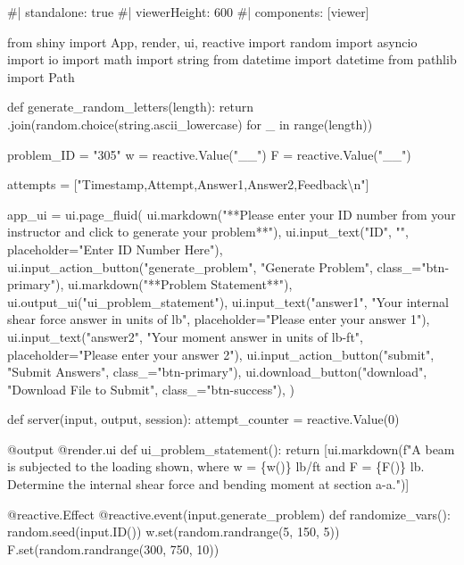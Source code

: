 \documentclass[
  letterpaper,
  DIV=11,
  numbers=noendperiod]{scrreprt}
\newenvironment{Shaded}{\begin{snugshade}}{\end{snugshade}}
\newcommand{\NormalTok}[1]{\textcolor[rgb]{0.00,0.23,0.31}{#1}}
\begin{document}
\begin{Shaded}
\begin{Highlighting}[]
\NormalTok{\#| standalone: true}
\NormalTok{\#| viewerHeight: 600}
\NormalTok{\#| components: [viewer]}

\NormalTok{from shiny import App, render, ui, reactive}
\NormalTok{import random}
\NormalTok{import asyncio}
\NormalTok{import io}
\NormalTok{import math}
\NormalTok{import string}
\NormalTok{from datetime import datetime}
\NormalTok{from pathlib import Path}

\NormalTok{def generate\_random\_letters(length):}
\NormalTok{    return \textquotesingle{}\textquotesingle{}.join(random.choice(string.ascii\_lowercase) for \_ in range(length))}

\NormalTok{problem\_ID = "305"}
\NormalTok{w = reactive.Value("\_\_")}
\NormalTok{F = reactive.Value("\_\_")}

\NormalTok{attempts = ["Timestamp,Attempt,Answer1,Answer2,Feedback\textbackslash{}n"]}

\NormalTok{app\_ui = ui.page\_fluid(}
\NormalTok{    ui.markdown("**Please enter your ID number from your instructor and click to generate your problem**"),}
\NormalTok{    ui.input\_text("ID", "", placeholder="Enter ID Number Here"),}
\NormalTok{    ui.input\_action\_button("generate\_problem", "Generate Problem", class\_="btn{-}primary"),}
\NormalTok{    ui.markdown("**Problem Statement**"),}
\NormalTok{    ui.output\_ui("ui\_problem\_statement"),}
\NormalTok{    ui.input\_text("answer1", "Your internal shear force answer in units of lb", placeholder="Please enter your answer 1"),}
\NormalTok{    ui.input\_text("answer2", "Your moment answer in units of lb{-}ft", placeholder="Please enter your answer 2"),}
\NormalTok{    ui.input\_action\_button("submit", "Submit Answers", class\_="btn{-}primary"),}
\NormalTok{    ui.download\_button("download", "Download File to Submit", class\_="btn{-}success"),}
\NormalTok{)}

\NormalTok{def server(input, output, session):}
\NormalTok{    attempt\_counter = reactive.Value(0)}

\NormalTok{    @output}
\NormalTok{    @render.ui}
\NormalTok{    def ui\_problem\_statement():}
\NormalTok{        return [ui.markdown(f"A beam is subjected to the loading shown, where w = \{w()\} lb/ft and F = \{F()\} lb. Determine the internal shear force and bending moment at section a{-}a.")]}

\NormalTok{    @reactive.Effect}
\NormalTok{    @reactive.event(input.generate\_problem)}
\NormalTok{    def randomize\_vars():}
\NormalTok{        random.seed(input.ID())}
\NormalTok{        w.set(random.randrange(5, 150, 5))}
\NormalTok{        F.set(random.randrange(300, 750, 10))}


\end{Highlighting}
\end{Shaded}
\end{document}

